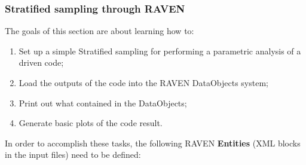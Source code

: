 \subsubsection{Stratified sampling through RAVEN}
\label{subsub:Stratifiedexample}
The goals of this section are about learning how to:
 \begin{enumerate}
   \item Set up a simple Stratified sampling for performing a parametric analysis of a driven code;
   \item Load the outputs of the code into the RAVEN DataObjects system;
   \item Print out what contained in the DataObjects;
   \item Generate basic plots of the code result.
\end{enumerate}  
In order to accomplish these tasks, the following RAVEN \textbf{Entities} (XML blocks in the input files) need to be defined:
